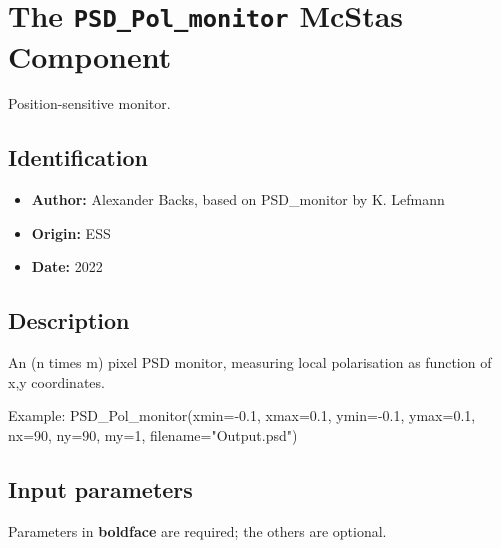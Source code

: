 \section{The \texttt{PSD\_Pol\_monitor} McStas Component}
Position-sensitive monitor.

\subsection*{Identification}
\begin{itemize}
  \item \textbf{Author:} Alexander Backs, based on PSD\_monitor by K. Lefmann
  \item \textbf{Origin:} ESS
  \item \textbf{Date:} 2022
\end{itemize}

\subsection*{Description}
An (n times m) pixel PSD monitor, measuring local polarisation as function of x,y coordinates.

Example: PSD\_Pol\_monitor(xmin=-0.1, xmax=0.1, ymin=-0.1, ymax=0.1, nx=90, ny=90, my=1, filename="Output.psd")

\subsection*{Input parameters}
Parameters in \textbf{boldface} are required; the others are optional.

